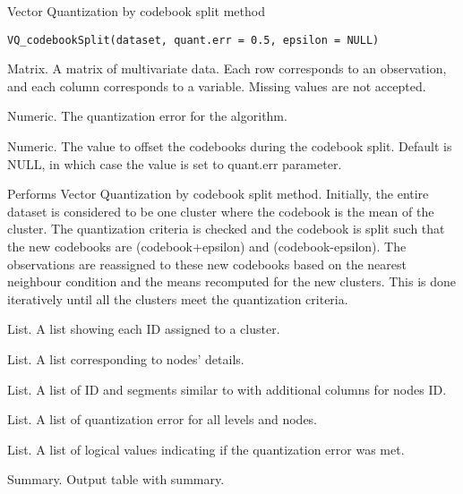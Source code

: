 \documentclass[letterpaper]{book}
\begin{document}
%
\begin{Description}
Vector Quantization by codebook split method
\end{Description}
%
\begin{Usage}
\begin{verbatim}
VQ_codebookSplit(dataset, quant.err = 0.5, epsilon = NULL)
\end{verbatim}
\end{Usage}
%
\begin{Arguments}
\begin{ldescription}
\item[\code{dataset}] Matrix. A matrix of multivariate data. Each row corresponds
to an observation, and each column corresponds to a variable. Missing values
are not accepted.

\item[\code{quant.err}] Numeric. The quantization error for the algorithm.

\item[\code{epsilon}] Numeric. The value to offset the codebooks during the
codebook split. Default is NULL, in which case the value is set to quant.err
parameter.
\end{ldescription}
\end{Arguments}
%
\begin{Details}
Performs Vector Quantization by codebook split method. Initially, the entire
dataset is considered to be one cluster where the codebook is the mean of
the cluster. The quantization criteria is checked and the codebook is split
such that the new codebooks are (codebook+epsilon) and (codebook-epsilon).
The observations are reassigned to these new codebooks based on the nearest
neighbour condition and the means recomputed for the new clusters. This is
done iteratively until all the clusters meet the quantization criteria.
\end{Details}
%
\begin{Value}
\begin{ldescription}
\item[\code{clusters}]  List. A list showing each ID assigned to a cluster.
\item[\code{nodes.clust}]  List. A list corresponding to nodes' details. 
\item[\code{idnodes}]  List. A list of ID and segments similar to
 with additional columns for nodes ID. 
\item[\code{error.quant}]  List. A list of quantization error for all levels and
nodes. \item[\code{plt.clust}]  List. A list of logical values indicating if the
quantization error was met. \item[\code{summary}]  Summary. Output table with
summary. 
\end{ldescription}
\end{Value}
\end{document}
